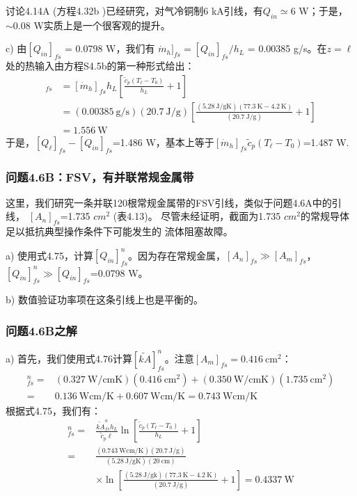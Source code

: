 讨论4.14A (方程4.32b )已经研究，对气冷铜制6 kA引线，有$Q_{in}\simeq$6 W；于是，
$\sim$0.08 W实质上是一个很客观的提升。

c) 由$[Q_{in}]_{fs}$ = 0.0798 W，我们有
$\dot{m}_h]_{fs}= [Q_{in}]_{fs}/h_L$ = 0.00385 g/s。在$z=\ell$处的热输入由方程S4.5b的第一种形式给出：
\begin{align*}
[Q_\ell]_{fs}&=[\dot{m}_h]_{fs}h_L\left[\frac{\tilde{c}_p(T_\ell-T_0)}{h_L}+1\right] \\
&=(0.00385\ \mathrm{g/s})(20.7\ \mathrm{J/g})\left[\frac{(5.28\ \mathrm{J/gK})(77.3\ \mathrm{K}-4.2\ \mathrm{K})}{(20.7\ \mathrm{J/g})}+1\right] \\
&=1.556\ \mathrm{W}
\end{align*}
于是，$[Q_\ell]_{fs}−[Q_{in}]_{fs}$=1.486 W，基本上等于$[\dot{m}_h]_{fs} \tilde{c}_p(T_\ell-T_0)$=1.487 W.

\subsubsection{问题4.6B：FSV，有并联常规金属带}
这里，我们研究一条并联120根常规金属带的FSV引线，类似于问题4.6A中的引线，
$[A_n]_{fs}$=1.735 $cm^2$ (表4.13)。
尽管未经证明，截面为1.735 $cm^2$的常规导体足以抵抗典型操作条件下可能发生的
流体阻塞故障。

a) 使用式4.75，计算$[Q_{in}]_{fs}^n$。因为存在常规金属，$[A_n]_{fs}\gg [A_m]_{fs}$，
$[Q_{in}]_{fs}^n\gg[Q_{in}]_{fs}$=0.0798 W。

b) 数值验证功率项在这条引线上也是平衡的。

\subsubsection{问题4.6B之解}
a) 首先，我们使用式4.76计算$[\tilde{kA}]_{fs}^{n}$。注意$[A_m]_{fs}=0.416\ \mathrm{cm^2}$：
\begin{align*}
[\tilde{kA}]_{fs}^{n}=&(0.327\ \mathrm{W/cm K})(0.416\ \mathrm{cm^2})+(0.350\ \mathrm{W/cmK})(1.735\ \mathrm{cm^2}) \\
=&0.136\ \mathrm{W cm/K}+0.607\ \mathrm{W cm/K}=0.743\ \mathrm{W cm/K}
\end{align*}
根据式4.75，我们有：
\begin{align*}%
[Q_{in}]_{fs}^{n}=&\frac{\tilde{kA}_{fs}^{n}h_L}{\tilde{c}_p\ell}\ln\left[\frac{\tilde{c}_p(T_\ell-T_0)}{h_L}+1\right] \\ \tag{4.75}
=&\frac{(0.743\ \mathrm{W cm/K})(20.7\ \mathrm{J/g})}{(5.28\ \mathrm{J/gK})(20\ \mathrm{cm})} \\
&\times\ln\left[\frac{(5.28\ \mathrm{J/gk})(77.3\ \mathrm{K}-4.2\ \mathrm{K})}{(20.7\ \mathrm{J/g})}+1\right]=0.4337\ \mathrm{W}
\end{align*}

